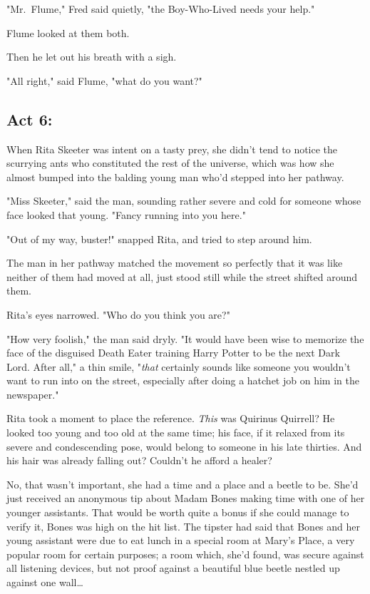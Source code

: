 "Mr.~Flume," Fred said quietly, "the Boy-Who-Lived needs your help."

Flume looked at them both.

Then he let out his breath with a sigh.

"All right," said Flume, "what do you want?"
\sbreak
\subsection{Act 6:}

When Rita Skeeter was intent on a tasty prey, she didn't tend to notice the 
scurrying ants who constituted the rest of the universe, which was how she 
almost bumped into the balding young man who'd stepped into her pathway.

"Miss Skeeter," said the man, sounding rather severe and cold for someone whose 
face looked that young. "Fancy running into you here."

"Out of my way, buster!" snapped Rita, and tried to step around him.

The man in her pathway matched the movement so perfectly that it was like 
neither of them had moved at all, just stood still while the street shifted 
around them.

Rita's eyes narrowed. "Who do you think you are?"

"How very foolish," the man said dryly. "It would have been wise to memorize 
the face of the disguised Death Eater training Harry Potter to be the next Dark 
Lord. After all," a thin smile, "\emph{that} certainly sounds like someone you 
wouldn't want to run into on the street, especially after doing a hatchet job 
on him in the newspaper."

Rita took a moment to place the reference. \emph{This} was Quirinus Quirrell? 
He looked too young and too old at the same time; his face, if it relaxed from 
its severe and condescending pose, would belong to someone in his late 
thirties. And his hair was already falling out? Couldn't he afford a healer?

No, that wasn't important, she had a time and a place and a beetle to be. She'd 
just received an anonymous tip about Madam Bones making time with one of her 
younger assistants. That would be worth quite a bonus if she could manage to 
verify it, Bones was high on the hit list. The tipster had said that Bones and 
her young assistant were due to eat lunch in a special room at Mary's Place, a 
very popular room for certain purposes; a room which, she'd found, was secure 
against all listening devices, but not proof against a beautiful blue beetle 
nestled up against one wall{\ldots}

